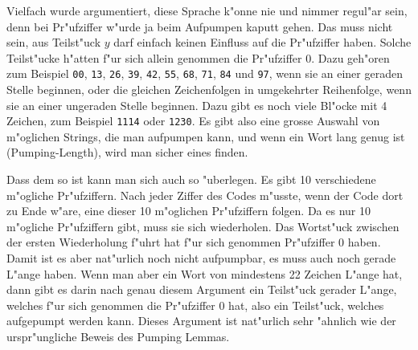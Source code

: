 {\begin{loesung}
Vielfach wurde argumentiert, diese Sprache k"onne nie und nimmer
regul"ar sein, denn bei Pr"ufziffer w"urde ja beim Aufpumpen
kaputt gehen. Das muss nicht sein, aus Teilst"uck $y$ darf
einfach keinen Einfluss auf die Pr"ufziffer haben. Solche
Teilst"ucke h"atten f"ur sich allein genommen die Pr"ufziffer 0.
Dazu geh"oren zum Beispiel
{\tt 00},
{\tt 13},
{\tt 26},
{\tt 39},
{\tt 42},
{\tt 55},
{\tt 68},
{\tt 71},
{\tt 84}
und
{\tt 97}, wenn sie an einer geraden Stelle beginnen, oder
die gleichen Zeichenfolgen in umgekehrter Reihenfolge, wenn sie
an einer ungeraden Stelle beginnen.
Dazu gibt es noch viele Bl"ocke mit 4 Zeichen, zum Beispiel
{\tt 1114} oder {\tt 1230}. Es gibt also eine grosse Auswahl von
m"oglichen Strings, die man aufpumpen kann, und wenn ein Wort
lang genug ist (Pumping-Length), wird man sicher eines finden.

Dass dem so ist kann man sich auch so "uberlegen. Es gibt 10
verschiedene m"ogliche Pr"ufziffern. Nach jeder Ziffer des Codes m"usste,
wenn der Code dort zu Ende w"are, eine dieser 10 m"oglichen Pr"ufziffern
folgen. Da es nur 10 m"ogliche Pr"ufziffern gibt, muss sie sich
wiederholen.
Das Wortst"uck zwischen der ersten Wiederholung f"uhrt hat f"ur sich
genommen Pr"ufziffer 0 haben. Damit ist es aber nat"urlich noch
nicht aufpumpbar, es muss auch noch gerade L"ange haben. Wenn man
aber ein Wort von mindestens 22 Zeichen L"ange hat, dann gibt es
darin nach genau diesem Argument ein Teilst"uck gerader L"ange,
welches f"ur sich genommen die Pr"ufziffer 0 hat, also ein Teilst"uck,
welches aufgepumpt werden kann. Dieses Argument ist nat"urlich
sehr "ahnlich wie der urspr"ungliche Beweis des Pumping Lemmas.


\end{loesung}}
